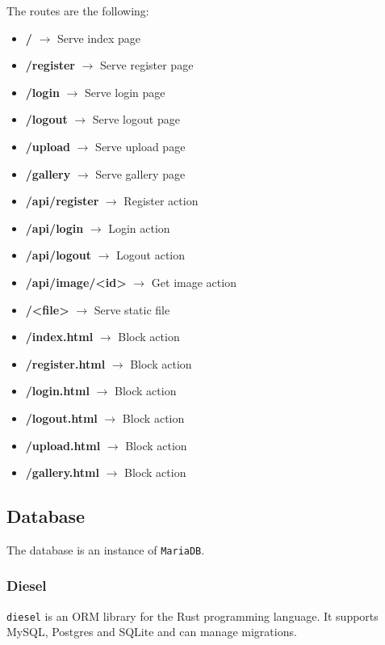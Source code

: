 \documentclass[../documentation.tex]{subfiles}
\begin{document}
The routes are the following:
\begin{itemize}
    \item \textbf{/} \(\rightarrow\) Serve index page
    \item \textbf{/register} \(\rightarrow\) Serve register page
    \item \textbf{/login} \(\rightarrow\) Serve login page
    \item \textbf{/logout} \(\rightarrow\) Serve logout page
    \item \textbf{/upload} \(\rightarrow\) Serve upload page
    \item \textbf{/gallery} \(\rightarrow\) Serve gallery page
    \item \textbf{/api/register} \(\rightarrow\) Register action
    \item \textbf{/api/login} \(\rightarrow\) Login action
    \item \textbf{/api/logout} \(\rightarrow\) Logout action
    \item \textbf{/api/image/<id>} \(\rightarrow\) Get image action
    \item \textbf{/<file>} \(\rightarrow\) Serve static file
    \item \textbf{/index.html} \(\rightarrow\) Block action
    \item \textbf{/register.html} \(\rightarrow\) Block action
    \item \textbf{/login.html} \(\rightarrow\) Block action
    \item \textbf{/logout.html} \(\rightarrow\) Block action
    \item \textbf{/upload.html} \(\rightarrow\) Block action
    \item \textbf{/gallery.html} \(\rightarrow\) Block action
\end{itemize}

\pagebreak

\subsection{Database}

The database is an instance of \texttt{MariaDB}.

\subsubsection{Diesel}

\texttt{diesel} is an ORM library for the Rust programming language.
It supports MySQL, Postgres and SQLite and can manage migrations.
\end{document}
